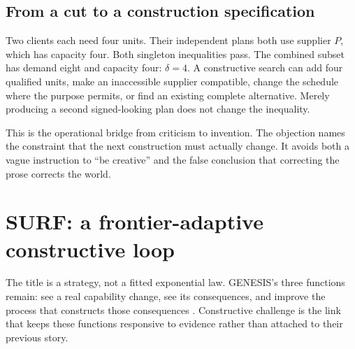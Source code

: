 \documentclass[11pt,a4paper]{article}
\begin{document}
\subsection{From a cut to a construction specification}
Two clients each need four units. Their independent plans both use supplier $P$, which has capacity four. Both singleton inequalities pass. The combined subset has demand eight and capacity four: $\delta=4$. A constructive search can add four qualified units, make an inaccessible supplier compatible, change the schedule where the purpose permits, or find an existing complete alternative. Merely producing a second signed-looking plan does not change the inequality.

This is the operational bridge from criticism to invention. The objection names the constraint that the next construction must actually change. It avoids both a vague instruction to ``be creative'' and the false conclusion that correcting the prose corrects the world.

\section{SURF: a frontier-adaptive constructive loop}
The title is a strategy, not a fitted exponential law. GENESIS's three functions remain: see a real capability change, see its consequences, and improve the process that constructs those consequences \cite[Secs.~3, 7]{genesis}. Constructive challenge is the link that keeps these functions responsive to evidence rather than attached to their previous story.
\end{document}
